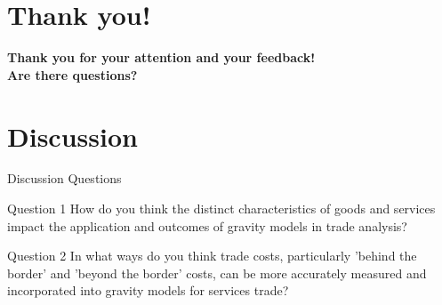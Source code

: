 



\section{Thank you!}



\begin{frame}

\vspace{0.1cm}

\begin{center}
  \huge  \textbf{Thank you for your attention and your feedback! \\ \vspace{1cm} Are there questions?}
\end{center}


    
\end{frame}







\section{Discussion}

\begin{frame}{Discussion Questions}

\large \justifying


\vspace{-0.7cm}

\begin{block}{Question 1}
    How do you think the distinct characteristics of goods and services impact the application and outcomes of gravity models in trade analysis?
\end{block}

\begin{block}{Question 2}
    In what ways do you think trade costs, particularly 'behind the border' and 'beyond the border' costs, can be more accurately measured and incorporated into gravity models for services trade?
\end{block}
   
    
\end{frame}














